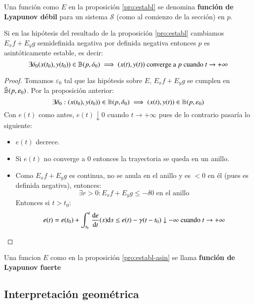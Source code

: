 \begin{dfn}\label{pro:establ-asin}
    Una función como $E$ en la proposición \ref{pro:establ} se denomina \textbf{función de Lyapunov débil} para un sistema $\mathcal{S}$ (como al comienzo de la sección) en $p$.
\end{dfn}
\begin{pro}
    Si en las hipótesis del resultado de la proposición \ref{pro:establ} cambiamos $E_x f + E_y g$ semidefinida negativa por definida negativa entonces $p$ es asintóticamente estable, es decir:
    $$
        \exists \delta_0  (x(t_0), y(t_0)) \in \mathbb{B}(p, \delta_0) \implies (x(t), y(t)) \text{ converge a $p$ cuando } t \to +\infty
    $$
\end{pro}
\begin{proof}
    Tomamos $\varepsilon_0$ tal que las hipótesis sobre $E$, $E_x f + E_y g$ se cumplen en $\bar{\mathbb{B}}(p, \varepsilon_0)$. Por la proposición anterior:
    $$
        \exists \delta_0 : (x(t_0), y(t_0)) \in \mathbb{B}(p, \delta_0) \implies (x(t), y(t)) \in \mathbb{B}(p, \varepsilon_0)
    $$
    Con $e(t)$ como antes, $e(t) \downarrow 0$ cuando $t \to +\infty$ pues de lo contrario pasaría lo siguiente:
    \begin{itemize}
        \item $e(t)$ decrece.
        \item Si $e(t)$ no converge a $0$ entonces la trayectoria se queda en un anillo.
        \item Como $E_x f + E_y g$ es continua, no se anula en el anillo y es $< 0$ en él (pues es definida negativa), entonces:
        $$
            \exists r>0 : E_x f + E_y g \leq - \delta  0 \text{ en el anillo}
        $$
        Entonces si $t > t_0$:
        $$
            e(t) = e(t_0) + \int_{t_0}^{t} \frac{\mathrm{d}e}{\mathrm{d}t}(s) \mathrm{d} s \leq e(t) - \gamma(t-t_0) \downarrow -\infty \text{ cuando } t\to +\infty
        $$
    \end{itemize}
\end{proof}
\begin{dfn}
    Una funcion $E$ como en la proposición \ref{pro:establ-asin} se llama \textbf{función de Lyapunov fuerte}
\end{dfn}
\subsection{Interpretación geométrica}

